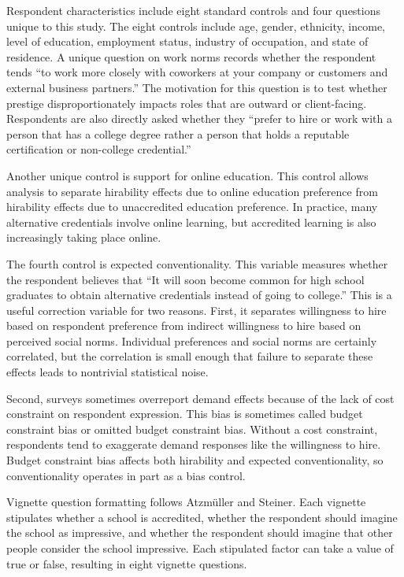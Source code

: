 \documentclass[review]{elsarticle}
\begin{document}
Respondent characteristics include eight standard controls and four questions unique to this study.
The eight controls include
age, gender, ethnicity, income,
level of education, employment status, industry of occupation, and state of residence.
A unique question on work norms records whether the respondent tends ``to work more closely with coworkers at your company or customers and external business partners.''
The motivation for this question is to test whether prestige disproportionately impacts roles that are outward or client-facing.
Respondents are also directly asked whether they
``prefer to hire or work with a person that has a college degree rather a person that holds a reputable certification or non-college credential.''

Another unique control is support for online education.
This control allows analysis to separate hirability effects due to online education preference
from hirability effects due to unaccredited education preference.
In practice, many alternative credentials involve online learning,
but accredited learning is also increasingly taking place online.

The fourth control is expected conventionality.
This variable measures whether the respondent believes that
``It will soon become common for high school graduates to obtain alternative credentials instead of going to college.''
This is a useful correction variable for two reasons.
First, it separates willingness to hire based on respondent preference
from indirect willingness to hire based on perceived social norms.
Individual preferences and social norms are certainly correlated,
but the correlation is small enough that failure to separate these effects leads to nontrivial statistical noise.

Second, surveys sometimes overreport demand effects because of the lack of cost constraint on respondent expression.
This bias is sometimes called budget constraint bias or omitted budget constraint bias\cite{ahlheim1998contingent, pachali2020omitted}.
Without a cost constraint, respondents tend to exaggerate demand responses like the willingness to hire.
Budget constraint bias affects both hirability and expected conventionality,
so conventionality operates in part as a bias control.

Vignette question formatting follows Atzm{\"u}ller and Steiner\cite{atzmuller2010experimental}.
Each vignette stipulates whether a school is accredited,
whether the respondent should imagine the school as impressive,
and whether the respondent should imagine that other people consider the school impressive.
Each stipulated factor can take a value of true or false,
resulting in eight vignette questions.
\end{document}

